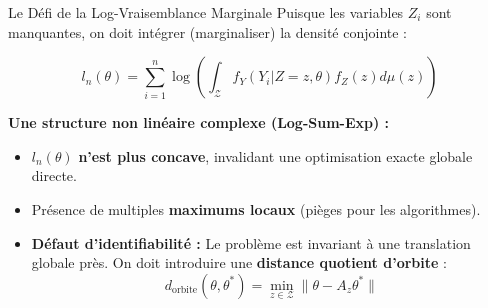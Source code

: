 \begin{frame}{Le Défi de la Log-Vraisemblance Marginale}
    Puisque les variables $Z_i$ sont manquantes, on doit intégrer (marginaliser) la densité conjointe :
    
    $$l_n(\theta) = \sum_{i=1}^n \log \left( \int_{\mathcal{Z}} f_Y(Y_i | Z=z, \theta) f_Z(z) d\mu(z) \right)$$
    
    \vspace{0.2cm}
    \textbf{Une structure non linéaire complexe (Log-Sum-Exp) :}
    \begin{itemize}
        \item $l_n(\theta)$ \alert{\textbf{n'est plus concave}}, invalidant une optimisation exacte globale directe.
        \item Présence de multiples \textbf{maximums locaux} (pièges pour les algorithmes).
        \item \textbf{Défaut d'identifiabilité :} Le problème est invariant à une translation globale près. On doit introduire une \textbf{distance quotient d'orbite} :
        $$d_{\text{orbite}}(\theta, \theta^*) = \min_{z \in \mathcal{Z}} \| \theta - A_z \theta^* \|$$
    \end{itemize}
\end{frame}